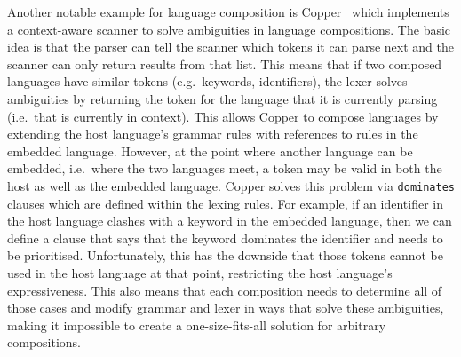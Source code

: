 \documentclass[sigplan,screen]{acmart}\settopmatter{printfolios=true,printccs=false,printacmref=false}
\begin{document}
Another notable example for language composition is Copper~\cite{wyk07context}
which implements a context-aware scanner to solve ambiguities in language
compositions. The basic idea is that the parser can tell the scanner which
tokens it can parse next and the scanner can only return results from that
list.  This means that if two composed languages have similar tokens
(e.g.~keywords, identifiers), the lexer solves ambiguities by returning the
token for the language that it is currently parsing (i.e.~that is currently in
context). This allows Copper to compose languages by extending the host
language's grammar rules with references to rules in the embedded language.
However, at the point where another language can be embedded, i.e.~where the
two languages meet, a token may be valid in both the host as well as the
embedded language.  Copper solves this problem via \texttt{dominates} clauses
which are defined within the lexing rules. For example, if an identifier in the
host language clashes with a keyword in the embedded language, then we can
define a clause that says that the keyword dominates the identifier and needs
to be prioritised. Unfortunately, this has the downside that those tokens
cannot be used in the host language at that point, restricting the host
language's expressiveness. This also means that each composition needs to
determine all of those cases and modify grammar and lexer in ways that solve
these ambiguities, making it impossible to create a one-size-fits-all solution
for arbitrary compositions.


\end{document}
